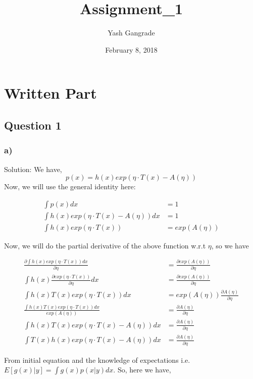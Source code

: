 \documentclass[]{article}
\title{Assignment\_1}
\author{Yash Gangrade}
\date{February 8, 2018}
\begin{document}
\maketitle

\section{Written Part}\label{written-part}

\subsection{Question 1}\label{question-1}

\subsubsection{a)}\label{a}

Solution: We have, \[p(x) = h(x)exp(\eta\cdot T(x) - A(\eta))\] Now, we
will use the general identity here:

\begin{align*}
    \int p(x) dx &= 1 \\
    \int h(x)exp(\eta\cdot T(x) - A(\eta)) dx &= 1 \\
    \int h(x)exp(\eta \cdot T(x)) &= exp(A(\eta))
\end{align*}

Now, we will do the partial derivative of the above function w.r.t
\(\eta\), so we have

\begin{align*}
   \frac{\partial \int h(x)exp(\eta \cdot T(x)) dx}{\partial \eta}  &= \frac{\partial exp(A(\eta))}{\partial \eta} \\
   \int h(x) \frac{\partial exp(\eta \cdot T(x))}{\partial \eta}dx  &= \frac{\partial exp(A(\eta))}{\partial \eta} \\
   \int h(x) T(x) exp(\eta \cdot T(x))dx  &= exp(A(\eta))\frac{\partial A(\eta)}{\partial \eta} \\
   \frac{\int h(x) T(x) exp(\eta \cdot T(x))dx}{exp(A(\eta))} &= \frac{\partial A(\eta)}{\partial \eta} \\
   \int h(x) T(x) exp(\eta \cdot T(x) - A(\eta))dx &= \frac{\partial A(\eta)}{\partial \eta} \\
   \int T(x)h(x)exp(\eta \cdot T(x) - A(\eta))dx &= \frac{\partial A(\eta)}{\partial \eta}
\end{align*}

From initial equation and the knowledge of expectations i.e.
\(E[g(x)|y] = \int g(x) p(x|y) dx\). So, here we have,
\end{document}
